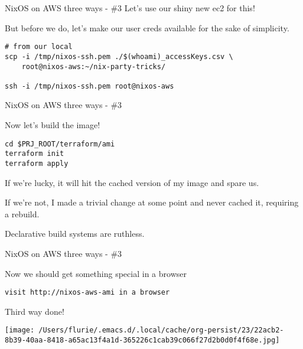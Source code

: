 \documentclass[bigger]{beamer}
\begin{document}
\begin{frame}[label={sec:orgcedc21c},fragile]{NixOS on AWS three ways - \#3}
 Let's use our shiny new ec2  for this!

\begin{exampleblock}{But before we do, let's make our user creds available for the sake of simplicity.}
\tiny
\begin{verbatim}
# from our local
scp -i /tmp/nixos-ssh.pem ./$(whoami)_accessKeys.csv \
    root@nixos-aws:~/nix-party-tricks/

ssh -i /tmp/nixos-ssh.pem root@nixos-aws
\end{verbatim}
\end{exampleblock}
\end{frame}
\begin{frame}[label={sec:org832c37f},fragile]{NixOS on AWS three ways - \#3}
 \begin{exampleblock}{Now let's build the image!}
\begin{verbatim}
cd $PRJ_ROOT/terraform/ami
terraform init
terraform apply
\end{verbatim}

If we're lucky, it will hit the cached version of my image and spare us.

If we're not, I made a trivial change at some point and never cached it, requiring a rebuild.

Declarative build systems are ruthless.
\end{exampleblock}
\end{frame}
\begin{frame}[label={sec:orgf89ea35},fragile]{NixOS on AWS three ways - \#3}
 \begin{exampleblock}{Now we should get something special in a browser}
\begin{verbatim}
visit http://nixos-aws-ami in a browser
\end{verbatim}

Third way done!
\begin{center}
\texttt{[image: /Users/flurie/.emacs.d/.local/cache/org-persist/23/22acb2-8b39-40aa-8418-a65ac13f4a1d-365226c1cab39c066f27d2b0d0f4f68e.jpg]}
\end{center}
\end{exampleblock}
\end{frame}
\end{document}
